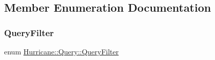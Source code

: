 \subsection{Member Enumeration Documentation}
\mbox{\label{classHurricane_1_1Query_a003517b82eaba58104d1749cf344eaa9}} 
\subsubsection{\texorpdfstring{Query\+Filter}{QueryFilter}}
{\footnotesize\ttfamily enum \mbox{\hyperlink{classHurricane_1_1Query_a003517b82eaba58104d1749cf344eaa9}{Hurricane\+::\+Query\+::\+Query\+Filter}}}

